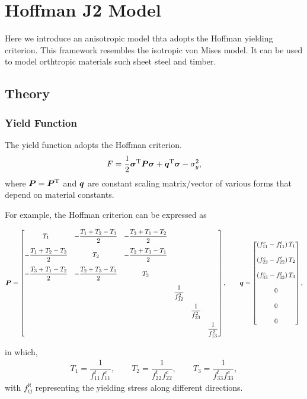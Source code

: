 \section{Hoffman J2 Model}\label{sec:hoffman}
Here we introduce an anisotropic model thta adopts the Hoffman yielding criterion. This framework resembles the isotropic von Mises model. It can be used to model orthtropic materials such sheet steel and timber.
\subsection{Theory}
\subsubsection{Yield Function}
The yield function adopts the Hoffman criterion.
\begin{gather}
F=\dfrac{1}{2}\bm{\sigma}^{\mathrm{T}}\bm{P}\bm{\sigma}+\bm{q}^{\mathrm{T}}\bm{\sigma}-\sigma_y^2,
\end{gather}
where $\bm{P}=\bm{P}^{\mathrm{T}}$ and $\bm{q}$ are constant scaling matrix/vector of various forms \cite{Oller2003} that depend on material constants.

For example, the Hoffman criterion can be expressed as
\begin{scriptsize}
\begin{gather}\label{eq:hoffman_criterion}
\bm{P}=\begin{bmatrix}
T_1&-\dfrac{T_1+T_2-T_3}{2}&-\dfrac{T_3+T_1-T_2}{2}&&&\\[4mm]
-\dfrac{T_1+T_2-T_3}{2}&T_2&-\dfrac{T_2+T_3-T_1}{2}&&&\\[4mm]
-\dfrac{T_3+T_1-T_2}{2}&-\dfrac{T_2+T_3-T_1}{2}&T_3&&&\\[4mm]
&&&\dfrac{1}{f_{12}^2}&&\\[4mm]
&&&&\dfrac{1}{f_{23}^2}&\\[4mm]
&&&&&\dfrac{1}{f_{13}^2}
\end{bmatrix},\qquad
\bm{q}=\begin{bmatrix}
\left(f_{11}^c-f_{11}^t\right)T_1\\[4mm]
\left(f_{22}^c-f_{22}^t\right)T_2\\[4mm]
\left(f_{33}^c-f_{33}^t\right)T_3\\[4mm]
0\\[4mm]
0\\[4mm]
0
\end{bmatrix},
\end{gather}
\end{scriptsize}
in which,
\begin{gather}
T_1=\dfrac{1}{f_{11}^tf_{11}^c},\qquad
T_2=\dfrac{1}{f_{22}^tf_{22}^c},\qquad
T_3=\dfrac{1}{f_{33}^tf_{33}^c},
\end{gather}
with $f_{ij}^\aleph$ representing the yielding stress along different directions.
